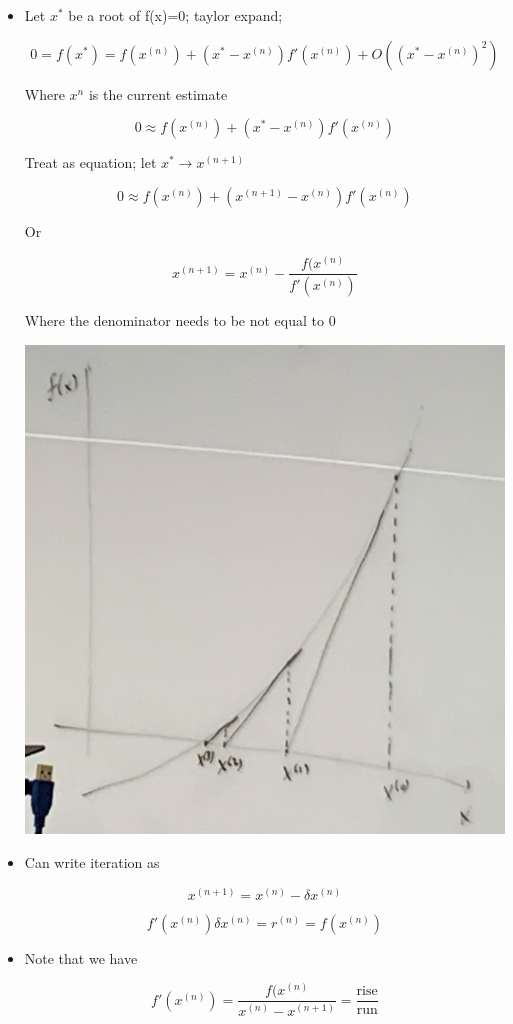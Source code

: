 \begin{itemize}
    \item Let $x^*$ be a root of f(x)=0; taylor expand;

    \[0= f(x^*) = f(x^{(n)})+ (x^*-x^{(n)})f'(x^{(n)}) + O((x^* - x^{(n)})^2)\]

    Where $x^n$ is the current estimate

    \[ 0 \approx f(x^{(n)}) + (x^*-x^{(n)})f'(x^{(n)})\]

    Treat as equation; let $x^* \rightarrow x^{(n+1)}$

    \[ 0 \approx f(x^{(n)}) + (x^{(n+1)}-x^{(n)})f'(x^{(n)})\]

    Or

    \begin{equation}
        x^{(n+1)} = x^{(n)} - \frac{f(x^{(n)}}{f'(x^{(n)})}
    \end{equation}

    Where the denominator needs to be not equal to 0


    \includegraphics[width = 0.4\linewidth]{Images/410_newtonsmethodinitialguess.png}

    \item Can write iteration as 

    \begin{equation}
        x^{(n+1)} = x^{(n)} - \delta x^{(n)}
    \end{equation}

    \begin{equation}
        f'(x^{(n)}) \delta x^{(n)} = r^{(n)} = f(x^{(n)})
    \end{equation}

    \item Note that we have 

    \[ f'(x^{(n)}) = \frac{f(x^{(n)}}{x^{(n)}-x^{(n+1)}} = \frac{\text{rise}}{\text{run}}\]

\end{itemize}

